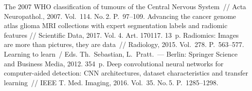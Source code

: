\begin{multicols}{2}
{\small\frenchspacing
{%
\begin{thebibliography}{99}
 The 2007 WHO classification of tumours of the Central Nervous 
System~// Acta Neuropathol., 2007. Vol.~114. No.\,2. P.~97--109.
 Advancing the cancer genome atlas glioma MRI collections with 
expert segmentation labels and radiomic features // Scientific Data, 2017. Vol. 4. Art. 170117. 13~p.
 Radiomics: Images are more than pictures, they are 
data~// Radiology, 2015. Vol.~278. P.~563--577.
Learning to learn~/ Eds. Th.~Sebastian, L.~Pratt.~--- Berlin: Springer Science and Business Media, 
2012. 354~p.
 Deep convolutional neural networks for computer-aided detection: CNN 
architectures, dataset characteristics and transfer learning~// IEEE T. Med. Imaging, 2016. 
Vol.~35. No.\,5. P.~1285--1298.
{

}
\end{thebibliography}}}
\end{multicols}
